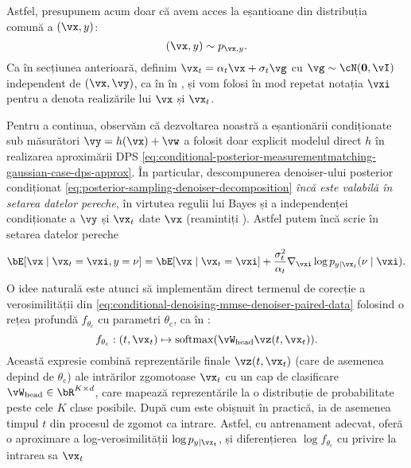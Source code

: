 \documentclass[../../book-main_ro.tex]{subfiles}
\begin{document}
Astfel, presupunem acum doar că avem acces la eșantioane din distribuția comună
a $(\vx, y)$:
\begin{equation}
  (\vx, y) \sim p_{\vx, y}.
\end{equation}
Ca în secțiunea anterioară, definim $\vx_t = \alpha_t \vx + \sigma_t \vg$
cu $\vg \sim \cN(\Zero, \vI)$ independent de $(\vx, \vy)$, ca în
 în ,
și vom folosi în mod repetat notația $\vxi$ pentru a denota realizările lui $\vx$
și $\vx_t$.

Pentru a continua, observăm că dezvoltarea noastră a eșantionării condiționate sub
măsurători $\vy = h(\vx) + \vw$ a folosit doar explicit
modelul direct $h$ în realizarea aproximării DPS
\eqref{eq:conditional-posterior-measurementmatching-gaussian-case-dps-approx}.
În particular, descompunerea denoiser-ului posterior condiționat
\eqref{eq:posterior-sampling-denoiser-decomposition} \textit{încă este valabilă în
setarea datelor pereche}, în virtutea regulii lui Bayes
și a independenței condiționate a $\vy$ și $\vx_t$ date $\vx$ (reamintiți
). Astfel putem încă scrie în setarea
datelor pereche
\begin{equation}\label{eq:conditional-denoising-mmse-denoiser-paired-data}
  \bE[ \vx \mid \vx_t=\vxi, y=\nu]
  =
  \bE[\vx \mid \vx_t=\vxi] 
  + \frac{\sigma_t^2}{\alpha_t} 
  \nabla_{\vxi}\log p_{y \mid \vx_t}(\nu\mid \vxi).
\end{equation}
O idee naturală este atunci să implementăm direct termenul de corecție a verosimilității din
\eqref{eq:conditional-denoising-mmse-denoiser-paired-data} folosind o rețea profundă
$f_{\theta_{\mathrm{c}}}$ cu parametri $\theta_{\mathrm{c}}$, ca în
: 
\begin{equation}
  f_{\theta_{\mathrm{c}}} : (t, \vx_t) \mapsto \softmax(\vW_{\mathrm{head}}
  \vz(t, \vx_t)).
\end{equation}
Această expresie combină reprezentările finale $\vz(t, \vx_t)$ (care de asemenea depind de
$\theta_{\mathrm{c}}$) ale intrărilor zgomotoase
$\vx_t$ cu un cap de clasificare $\vW_{\mathrm{head}} \in \bR^{K \times d}$, care mapează
reprezentările la o distribuție de probabilitate peste cele $K$ clase posibile.
După cum este obișnuit în practică, ia de asemenea timpul $t$ din procesul de zgomot ca
intrare.
Astfel, cu antrenament adecvat, oferă o aproximare a log-verosimilității
$\log p_{y \mid \vx_t}$, și diferențierea $\log f_{\theta_{\mathrm{c}}}$ cu
privire la intrarea sa $\vx_t$
\end{document}
